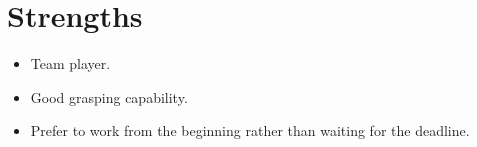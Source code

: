\documentclass[a4paper,10pt]{article}
\begin{document}
\section{Strengths}
\begin{itemize}
\item Team player.
\item Good grasping capability.
\item Prefer to work from the beginning rather than waiting for the deadline.
\end{itemize}


\end{document}
